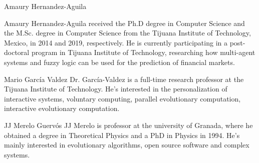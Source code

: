 \documentclass{ieeeaccess}
\begin{document}
\begin{IEEEbiography}{Amaury
    Hernandez-Aguila}

  Amaury Hernandez-Aguila received the Ph.D degree in Computer Science and the 
  M.Sc. degree in Computer Science from the Tijuana Institute of Technology,
  Mexico, in 2014 and 2019, respectively. He is currently participating in a
  post-doctoral program in Tijuana Institute of Technology, researching how
  multi-agent systems and fuzzy logic can be used for the prediction of
  financial markets.

\end{IEEEbiography}

\begin{IEEEbiography}{Mario Garc\'{i}a Valdez} 
  Dr. Garc\'{i}a-Valdez is a full-time research professor at the Tijuana
  Institute of Technology. He's interested in the personalization of
  interactive systems, voluntary computing, parallel evolutionary
  computation, interactive evolutionary computation.
\end{IEEEbiography}

\begin{IEEEbiography}{JJ Merelo Guerv\'{o}s} 
  JJ Merelo is professor at the university of Granada, where he obtained a
  degree in Theoretical Physics and a PhD in Physics in 1994. He's mainly
  interested in evolutionary algorithms, open source software and complex
  systems.
  
\end{IEEEbiography}
\end{document}
